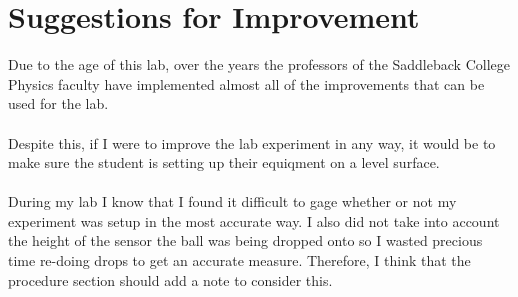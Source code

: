 \chapter{Suggestions for Improvement}

Due to the age of this lab, over the years the professors of the Saddleback College
Physics faculty have implemented almost all of the improvements that can be used for the lab.\\\\
Despite this, if I were to improve the lab experiment in any way, it would be to 
make sure the student is setting up their equiqment on a level surface.\\\\
During my lab I know that I found it difficult to gage whether or not my experiment was
setup in the most accurate way. I also did not take into account the height of the 
sensor the ball was being dropped onto so I wasted precious time re-doing drops to get an
accurate measure. Therefore, I think that the procedure section should add a note to consider this.


